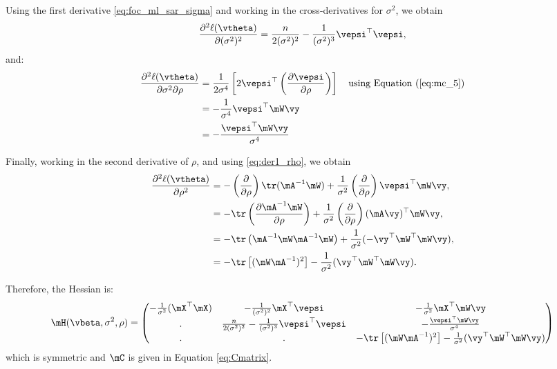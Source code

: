 \documentclass[english,12pt]{book}\usepackage[]{graphicx}\usepackage[]{xcolor}
\begin{document}
Using the first derivative \eqref{eq:foc_ml_sar_sigma} and working in the cross-derivatives for $\sigma^2$, we obtain
\begin{equation}\label{eq:sar_der_sigma_sigma}
	\frac{\partial^2 \ell(\vtheta)}{\partial (\sigma^2)^2}  = \frac{n}{2(\sigma^2) ^2} - \frac{1}{(\sigma^2)^3} \vepsi^\top \vepsi,
\end{equation}
%
and:
\begin{equation}\label{eq:sar_der_sigma_rho}
\begin{aligned}
\frac{\partial^2 \ell(\vtheta) }{\partial \sigma^2 \partial \rho}  & = \frac{1}{2\sigma ^ 4}\left[2\vepsi^\top \left(\frac{\partial \vepsi}{\partial \rho}\right)\right] \quad \mbox{using Equation (\ref{eq:mc_5})}\\
& =  - \frac{1}{\sigma ^ 4}\vepsi ^\top \mW\vy \\
& =  -\frac{\vepsi^\top\mW\vy}{\sigma ^ 4}
\end{aligned}
\end{equation}

Finally, working in the second derivative of $\rho$, and using \eqref{eq:der1_rho}, we obtain
\begin{equation}\label{eq:sar_der_rho_rho}
\begin{aligned}
\frac{\partial^2 \ell(\vtheta) }{\partial \rho ^2}  & = -\left(\frac{\partial }{\partial \rho}\right)\tr(\mA^{-1}\mW) + \frac{1}{\sigma^2}\left(\frac{\partial }{\partial \rho}\right)\vepsi^\top\mW\vy, \\
& = - \tr\left( \frac{\partial \mA^{-1}\mW}{\partial \rho}\right) + \frac{1}{\sigma^2}\left(\frac{\partial }{\partial \rho}\right)(\mA\vy)^\top\mW\vy, \\
& = - \tr\left( \mA^{-1}\mW\mA^{-1}\mW \right)+ \frac{1}{\sigma^2}(- \vy^{\top}\mW^{\top}\mW\vy), \\
& = - \tr\left[(\mW\mA^{-1})^2\right] - \frac{1}{\sigma^2}(\vy^{\top}\mW^{\top}\mW\vy).
\end{aligned}
\end{equation}


Therefore, the Hessian is:
\begin{equation}\label{eq:hessian_sml}
	\mH(\vbeta, \sigma^2, \rho) = 
	\begin{pmatrix}
	- \frac{1}{\sigma^2}(\mX^\top \mX) & - \frac{1}{(\sigma^2)^2} \mX^\top \vepsi & - \frac{1}{\sigma^2} \mX^\top \mW\vy \\
		 .& \frac{n}{2(\sigma^2) ^2} - \frac{1}{(\sigma^2)^3} \vepsi^\top \vepsi & -\frac{\vepsi^\top\mW\vy}{\sigma ^ 4} \\
		 .& . & - \tr\left[(\mW\mA^{-1})^2\right] - \frac{1}{\sigma^2}(\vy^{\top}\mW^{\top}\mW\vy)
	\end{pmatrix} 
\end{equation}
%
which is symmetric and $\mC$ is given in Equation \eqref{eq:Cmatrix}.
\end{document}
